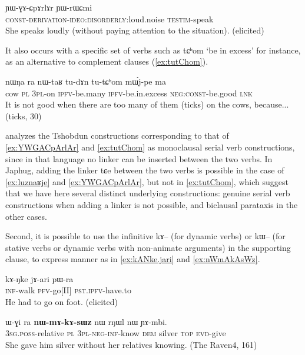 \documentclass[oldfontcommands,oneside,a4paper,11pt]{article}
\newcommand{\ipa}[1]{{\phon \mbox{#1}}} %
\begin{document}
\begin{exe}
\ex \label{ex:YWGACpArlAr}
\gll
\ipa{ɲɯ-ɣɤ-ɕpɤrlɤr} 	\ipa{ɲɯ-rɯɕmi} \\
\textsc{const-derivation-ideo:disorderly:}loud.noise \textsc{testim}-speak\\
\glt She speaks loudly (without paying attention to the situation). (elicited)
\end{exe}

It also occurs with a specific set of verbs such as \ipa{tɕʰom} `be in excess' for instance, as an alternative to complement clauses (\ref{ex:tutChom}).

\begin{exe}
\ex \label{ex:tutChom}
\gll
\ipa{nɯŋa} 	\ipa{ra} 	\ipa{nɯ-taʁ} 	\ipa{tu-dɤn} 	\ipa{tu-tɕʰom} 	\ipa{mɯ́j-pe} 	\ipa{ma} \\
cow \textsc{pl} \textsc{3pl}-on \textsc{ipfv}-be.many \textsc{ipfv}-be.in.excess \textsc{neg:const}-be.good \textsc{lnk} \\
\glt It is not good when there are too many of them (ticks) on the cows, because... (ticks, 30)
\end{exe}

 \citet{sun12complementation} analyzes the  Tshobdun constructions     corresponding to that of \ref{ex:YWGACpArlAr} and \ref{ex:tutChom} as monoclausal serial verb constructions, since in that language no linker can be inserted between the two verbs. In Japhug,   adding the linker \ipa{tɕe} between the two verbs is possible in the case of \ref{ex:luznaʁje} and \ref{ex:YWGACpArlAr}, but not in \ref{ex:tutChom}, which suggest that we have here several distinct underlying constructions: genuine serial verb constructions when adding a linker is not possible, and biclausal parataxis in the other cases. %


Second, it is possible to use the infinitive \ipa{kɤ--} (for dynamic verbs) or \ipa{kɯ--} (for stative verbs or dynamic verbs with non-animate arguments) in the supporting clause, to express manner as in \ref{ex:kANke.jari} and \ref{ex:nWmAkAsWz}.

\begin{exe}
\ex \label{ex:kANke.jari}
\gll
\ipa{kɤ-ŋke} 	\ipa{jɤ-ari} 	\ipa{pɯ-ra} \\
\textsc{inf}-walk \textsc{pfv}-go[II] \textsc{pst.ipfv}-have.to \\
\glt He had to go on foot. (elicited)
\end{exe}

 
\begin{exe}
\ex \label{ex:nWmAkAsWz}
\gll
\ipa{ɯ-ɣi}   	\ipa{ra}   	\ipa{\textbf{nɯ-mɤ-kɤ-sɯz}}   	\ipa{nɯ}   	\ipa{rŋɯl}   	\ipa{nɯ}   	\ipa{ɲɤ-mbi.}   \\
\textsc{3sg.poss}-relative \textsc{pl} \textsc{3pl-neg-inf}-know \textsc{dem} silver \textsc{top} \textsc{evd}-give \\
\glt  She gave him silver without her relatives knowing. (The Raven4, 161)
\end{exe}
\end{document}
